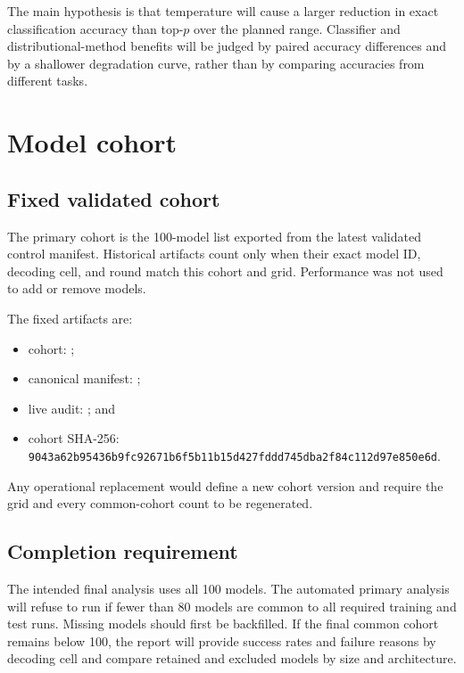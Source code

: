 \documentclass[11pt,a4paper]{article}
\begin{document}
The main hypothesis is that temperature will cause a larger reduction in exact
classification accuracy than top-$p$ over the planned range. Classifier and
distributional-method benefits will be judged by paired accuracy differences
and by a shallower degradation curve, rather than by comparing accuracies from
different tasks.

\section{Model cohort}

\subsection{Fixed validated cohort}

The primary cohort is the 100-model list exported from the latest validated
control manifest. Historical artifacts count only when their exact model ID,
decoding cell, and round match this cohort and grid. Performance was not used
to add or remove models.

The fixed artifacts are:

\begin{itemize}
  \item cohort: ;
  \item canonical manifest:
        ;
  \item live audit: ; and
  \item cohort SHA-256:
        \texttt{9043a62b95436b9fc92671b6f5b11b15d427fddd745dba2f84c112d97e850e6d}.
\end{itemize}

Any operational replacement would define a new cohort version and require the
grid and every common-cohort count to be regenerated.

\subsection{Completion requirement}

The intended final analysis uses all 100 models. The automated primary analysis
will refuse to run if fewer than 80 models are common to all required training
and test runs. Missing models should first be backfilled. If the final common
cohort remains below 100, the report will provide success rates and failure
reasons by decoding cell and compare retained and excluded models by size and
architecture.
\end{document}
